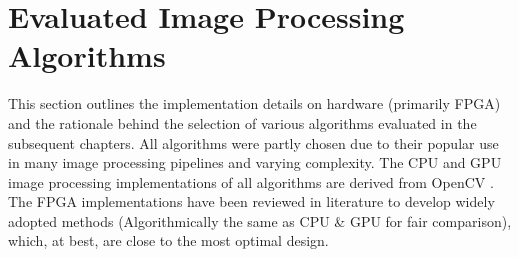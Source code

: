 \section{Evaluated Image Processing Algorithms}
This section outlines the implementation details on hardware (primarily FPGA) and the rationale behind the selection of various algorithms evaluated in the subsequent chapters. All algorithms were partly chosen due to their popular use in many image processing pipelines and varying complexity. The CPU and GPU image processing implementations of all algorithms are derived from OpenCV \cite{opencv_library}.  The FPGA implementations have been reviewed in literature to develop widely adopted methods (Algorithmically the same as CPU \& GPU for fair comparison), which, at best, are close to the most optimal design.

